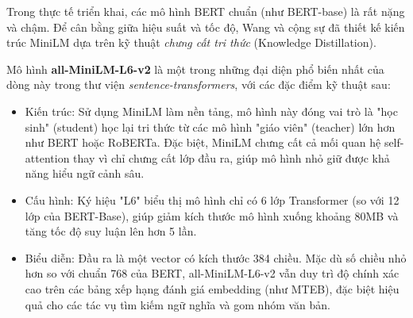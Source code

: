 Trong thực tế triển khai, các mô hình BERT chuẩn (như BERT-base) là rất nặng và chậm. Để cân bằng giữa hiệu suất và tốc độ, Wang và cộng sự đã thiết kế kiến trúc MiniLM \cite{wang2020minilmdeepselfattentiondistillation} dựa trên kỹ thuật \textit{chưng cất tri thức} (Knowledge Distillation).\vspace{0.3cm}

Mô hình \textbf{all-MiniLM-L6-v2} là một trong những đại diện phổ biến nhất của dòng này trong thư viện \textit{sentence-transformers}, với các đặc điểm kỹ thuật sau:\vspace{-0.1cm}
\begin{itemize}[label={--}, itemsep=1pt]
    \item Kiến trúc: Sử dụng MiniLM làm nền tảng, mô hình này đóng vai trò là "học sinh" (student) học lại tri thức từ các mô hình "giáo viên" (teacher) lớn hơn như BERT hoặc RoBERTa. Đặc biệt, MiniLM chưng cất cả mối quan hệ self-attention thay vì chỉ chưng cất lớp đầu ra, giúp mô hình nhỏ giữ được khả năng hiểu ngữ cảnh sâu.
    \item Cấu hình: Ký hiệu "L6" biểu thị mô hình chỉ có 6 lớp Transformer (so với 12 lớp của BERT-Base), giúp giảm kích thước mô hình xuống khoảng 80MB và tăng tốc độ suy luận lên hơn 5 lần.
    \item Biểu diễn: Đầu ra là một vector có kích thước 384 chiều. Mặc dù số chiều nhỏ hơn so với chuẩn 768 của BERT, all-MiniLM-L6-v2 vẫn duy trì độ chính xác cao trên các bảng xếp hạng đánh giá embedding (như MTEB), đặc biệt hiệu quả cho các tác vụ tìm kiếm ngữ nghĩa và gom nhóm văn bản.
\end{itemize}